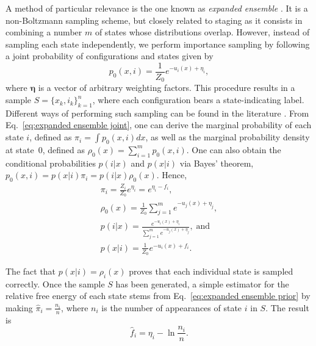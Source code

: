 \documentclass[journal=jctcce,manuscript=article]{achemso}
\newcommand{\vt}[1]{\boldsymbol{\mathbf{#1}}}   %
\begin{document}
A method of particular relevance is the one known as \textit{expanded ensemble} \cite{Lyubartsev_1992}. It is a non-Boltzmann sampling scheme, but closely related to staging as it consists in combining a number $m$ of states whose distributions overlap. However, instead of sampling each state independently, we perform importance sampling by following a joint probability of configurations and states given by \cite{Nymeyer_2010}
\begin{equation}
\label{eq:expanded ensemble joint}
p_0(x, i) = \frac{1}{Z_0} e^{-u_i(x) + \eta_i},
\end{equation}
where $\vt \eta$ is a vector of arbitrary weighting factors. This procedure results in a sample $S = \{x_k,i_k\}_{k=1}^n$, where each configuration bears a state-indicating label. Different ways of performing such sampling can be found in the literature \cite{Lyubartsev_1992, Nymeyer_2010, Christ_2007, Christ_2008, Christ_2009, Katzgraber_2006, Trebst_2006, Escobedo_2007, Escobedo_2008, Martinez-veracoechea_2008, Chodera_2011_2}. From Eq.~\eqref{eq:expanded ensemble joint}, one can derive the marginal probability of each state $i$, defined as $\pi_i = \int p_0(x,i)dx$, as well as the marginal probability density at state~$0$, defined as $\rho_0(x) = \sum_{i=1}^m p_0(x,i)$. One can also obtain the conditional probabilities $p(i|x)$ and $p(x|i)$ via Bayes' theorem, $p_0(x,i) = p(x|i) \pi_i = p(i|x) \rho_0(x)$. Hence,
\begin{subequations}
	\label{eq:expanded ensemble probabilities}
	\begin{gather}
	\pi_i = \frac{Z_i}{Z_0} e^{\eta_i} = e^{\eta_i - f_i}, \label{eq:expanded ensemble prior} \\
	\rho_0(x) = \frac{1}{Z_0} \sum_{j=1}^m e^{-u_j(x) + \eta_j}, \label{eq:expanded ensemble evidence} \\
	p(i|x) = \frac{e^{-u_i(x) + \eta_i}}{\sum_{j=1}^m e^{-u_j(x) + \eta_j}}, \; \text{and} \label{eq:expanded ensemble posterior} \\
	p(x|i) = \frac{1}{Z_0} e^{-u_i(x) + f_i}. \label{eq:expanded ensemble likelihood}
	\end{gather}
\end{subequations}

The fact that $p(x|i) = \rho_i(x)$ proves that each individual state is sampled correctly. Once the sample $S$ has been generated, a simple estimator for the relative free energy of each state stems from Eq.~\eqref{eq:expanded ensemble prior} by making $\hat \pi_i = \frac{n_i}{n}$, where $n_i$ is the number of appearances of state $i$ in $S$. The result is
\begin{equation}
\label{eq:expanded ensemble histogram estimator}
\hat f_i = \eta_i - \ln \frac{n_i}{n}.
\end{equation}
\end{document}

